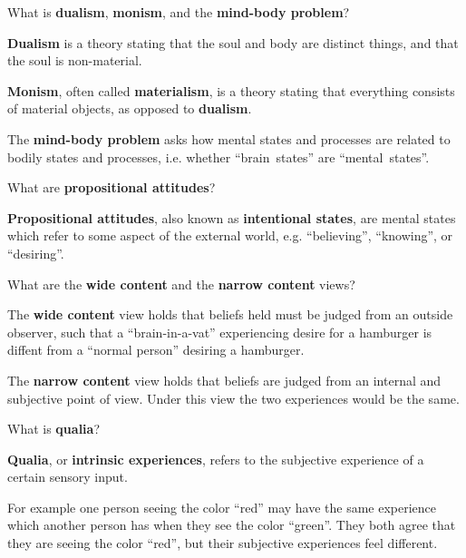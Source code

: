 \begin{flashcard}[Question]{What is \textbf{dualism}, \textbf{monism}, and the \textbf{mind-body problem}?}
\begin{center}
\textbf{Dualism} is a theory stating that the soul and body are distinct things, and that the soul is non-material.

\medskip

\textbf{Monism}, often called \textbf{materialism}, is a theory stating that everything consists of material objects, as opposed to \textbf{dualism}.

\medskip

The \textbf{mind-body problem} asks how mental states and processes are related to bodily states and processes, i.e. whether ``brain~states'' are ``mental~states''.
\end{center}
\end{flashcard}

\begin{flashcard}[Question]{What are \textbf{propositional attitudes}?}
\begin{center}
\textbf{Propositional attitudes}, also known as \textbf{intentional states}, are mental states which refer to some aspect of the external world, e.g. ``believing'', ``knowing'', or ``desiring''.
\end{center}
\end{flashcard}

\begin{flashcard}[Question]{What are the \textbf{wide content} and the \textbf{narrow content} views?}
\begin{center}
The \textbf{wide content} view holds that beliefs held must be judged from an outside observer, such that a ``brain-in-a-vat'' experiencing desire for a hamburger is diffent from a ``normal person'' desiring a hamburger.

\medskip

The \textbf{narrow content} view holds that beliefs are judged from an internal and subjective point of view. Under this view the two experiences would be the same.

\end{center}
\end{flashcard}

\begin{flashcard}[Question]{What is \textbf{qualia}?}
\begin{center}
\textbf{Qualia}, or \textbf{intrinsic experiences}, refers to the subjective experience of a certain sensory input.

\medskip

For example one person seeing the color ``red'' may have the same experience which another person has when they see the color ``green''. They both agree that they are seeing the color ``red'', but their subjective experiences feel different.
\end{center}
\end{flashcard}
